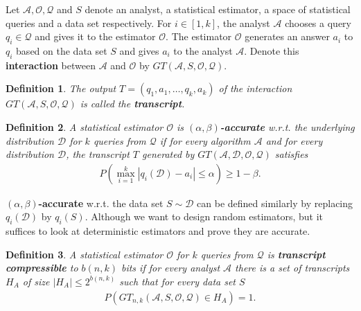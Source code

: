 \documentclass[]{article}
\newtheorem{definition}{Definition}[section] %
\begin{document}
Let $\mathcal{A}, \mathcal{O}, \mathcal{Q}$ and $S$ denote an analyst, a statistical estimator, a space of statistical queries and a data set respectively. For $i \in [1,k]$, the analyst $\mathcal{A}$ chooses a query $q_i \in \mathcal{Q}$ and gives it to the estimator $\mathcal{O}$. The estimator $\mathcal{O}$ generates an answer $a_i$ to $q_i$ based on the data set $S$ and gives $a_i$ to the analyst $\mathcal{A}$. Denote this \textbf{interaction} between $\mathcal{A}$ and $\mathcal{O}$ by  $GT(\mathcal{A},S,\mathcal{O},\mathcal{Q})$. 

\begin{definition}
	 The output $T = (q_1, a_1, \dots, q_k, a_k)$ of the interaction $GT(\mathcal{A},S,\mathcal{O},\mathcal{Q})$ is called the \textbf{transcript}.
\end{definition}

\begin{definition}
	A statistical estimator $\mathcal{O}$ is \textbf{$(\alpha,\beta)$-accurate} w.r.t. the underlying distribution $\mathcal{D}$ for $k$ queries from $\mathcal{Q}$ if for every algorithm $\mathcal{A}$ and for every distribution $\mathcal{D}$, the transcript $T$ generated by $GT(\mathcal{A},\mathcal{D},\mathcal{O},\mathcal{Q})$ satisfies 
	\begin{align*}
		P\left(\max_{i=1}^k|q_i(\mathcal{D}) - a_i| \le \alpha \right) \ge 1 - \beta.
	\end{align*}
\end{definition}

\textbf{$(\alpha,\beta)$-accurate} w.r.t. the data set $S \sim \mathcal{D}$ can be defined similarly by replacing $q_i(\mathcal{D})$ by $q_i(S)$. Although we want to design random estimators, but it suffices to look at deterministic estimators and prove they are accurate. 

\begin{definition}
	A statistical estimator $\mathcal{O}$ for $k$ queries from $\mathcal{Q}$ is \textbf{transcript compressible} to $b(n,k)$ bits if for every analyst $\mathcal{A}$ there is a set of transcripts $H_A$ of size $|H_A| \le 2^{b(n,k)}$ such that for every data set $S$ 
	\begin{align*}
		P(GT_{n,k}(\mathcal{A},S,\mathcal{O},\mathcal{Q}) \in H_A) = 1.
	\end{align*}
\end{definition}
\end{document}
